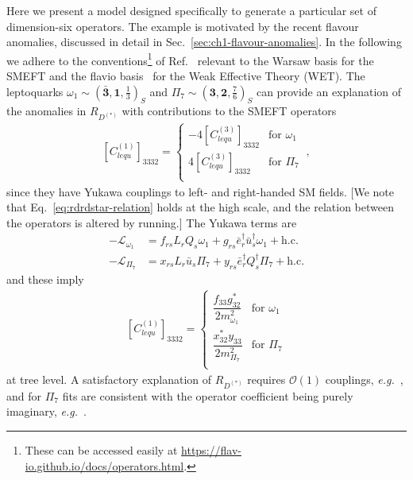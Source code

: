 Here we present a model designed specifically to generate a particular set of
dimension-six operators. The example is motivated by the recent flavour
anomalies, discussed in detail in Sec.~\ref{sec:ch1-flavour-anomalies}. In the
following we adhere to the conventions\footnote{These can be accessed easily at
  \url{https://flav-io.github.io/docs/operators.html}.} of
Ref.~\cite{Aebischer:2017ugx} relevant to the Warsaw basis for the SMEFT and the
\textsf{flavio} basis~\cite{Straub:2018kue} for the Weak Effective Theory (WET).
The leptoquarks
$\omega_{1} \sim (\mathbf{\bar{3}}, \mathbf{1}, \tfrac{1}{3})_{S}$ and
$\Pi_{7} \sim (\mathbf{3}, \mathbf{2}, \tfrac{7}{6})_{S}$ can provide an
explanation of the anomalies in $R_{D^{(*)}}$ with contributions to the SMEFT
operators
\begin{align}
  \label{eq:rdrdstar-relation}
  [C_{lequ}^{(1)}]_{3332} = \begin{cases}
    - 4 [C_{lequ}^{(3)}]_{3332} &\text{for } \omega_{1} \\
    4 [C_{lequ}^{(3)}]_{3332}  &\text{for } \Pi_{7} \\
  \end{cases} \ ,
\end{align}
since they have Yukawa couplings to left- and right-handed SM fields. [We note
that Eq.~\eqref{eq:rdrdstar-relation} holds at the high scale, and the relation
between the operators is altered by running.] The Yukawa terms are
\begin{align}
  - \mathcal{L}_{\omega_{1}} &= f_{rs} L_{r} Q_{s} \omega_{1} + g_{rs} \bar{e}^{\dagger}_{r} \bar{u}^{\dagger}_{s} \omega_{1} + \text{h.c.} \label{eq:omega1-coup} \\
  - \mathcal{L}_{\Pi_{7}} &= x_{rs} L_{r} \bar{u}_{s} \Pi_{7} + y_{rs} \bar{e}^{\dagger}_{r} Q^{\dagger}_{s} \Pi_{7} + \text{h.c.} \label{eq:pi7-coup}
\end{align}
and these imply
\begin{align}
  \label{eq:omega1-pi7-clequ}
  [C_{lequ}^{(1)}]_{3332} = \begin{cases}
    \dfrac{f_{33} g_{32}^{*}}{2 m_{\omega_{1}}^{2}} &\text{for } \omega_{1} \\
    \dfrac{x_{32}^{*}y_{33}}{2 m_{\Pi_{7}}^{2}} &\text{for } \Pi_{7} \\
  \end{cases}
\end{align}
at tree level. A satisfactory explanation of $R_{D^{(*)}}$ requires
$\mathcal{O}(1)$ couplings, \textit{e.g.}~\cite{Cai:2017wry, Popov:2019tyc}, and
for $\Pi_{7}$ fits are consistent with the operator coefficient being purely
imaginary, \textit{e.g.}~\cite{Angelescu:2018tyl}.


